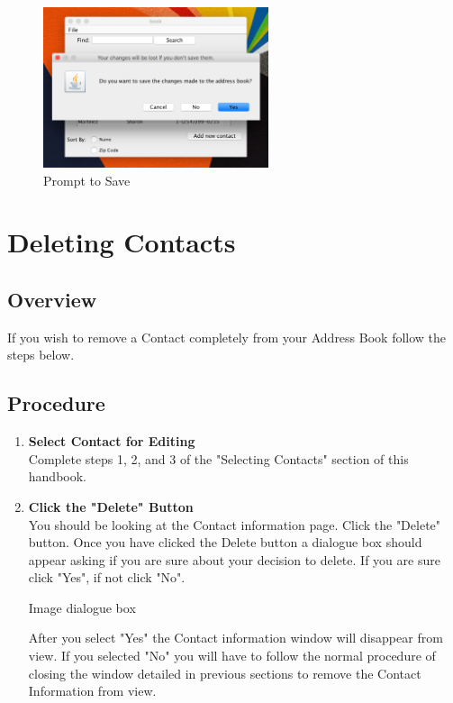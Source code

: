 \documentclass[a4paper, 11pt]{article}
\begin{document}
\begin{enumerate}[label=\textbf{\arabic*})]
    \begin{figure}[h!]
    \centering
      \includegraphics[width=250]{close_save_error.png}
      \caption{Prompt to Save}
    \end{figure}
\end{enumerate}

\clearpage

\section{Deleting Contacts}
\subsection{Overview}
If you wish to remove a Contact completely from your Address Book follow the steps below.
\subsection{Procedure}
\begin{enumerate}[label=\textbf{\arabic*})]
    \item{\textbf{Select Contact for Editing}}\\ Complete steps 1, 2, and 3 of the "Selecting Contacts" section of this handbook. 
    
    \item{\textbf{Click the "Delete" Button}}\\ You should be looking at the Contact information page. Click the "Delete" button. Once you have clicked the Delete button a dialogue box should appear asking if you are sure about your decision to delete. If you are sure click "Yes", if not click "No".
    
    Image dialogue box
    
    After you select "Yes" the Contact information window will disappear from view. If you selected "No" you will have to follow the normal procedure of closing the window detailed in previous sections to remove the Contact Information from view.  
\end{enumerate}
\end{document}
